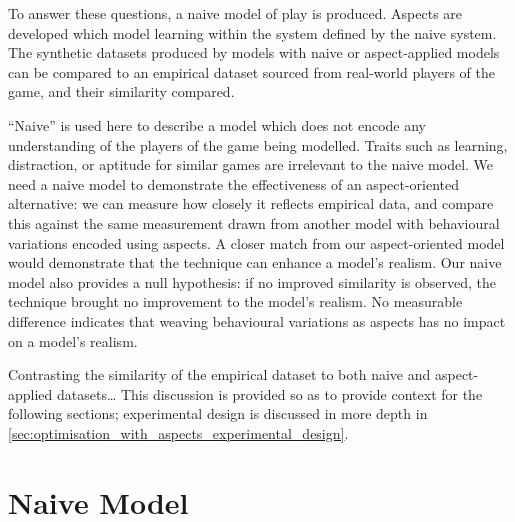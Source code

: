 
To answer these questions, a naive model of play is produced. Aspects are
developed which model learning within the system defined by the naive system.
The synthetic datasets produced by models with naive or aspect-applied models
can be compared to an empirical dataset sourced from real-world players of the
game, and their similarity compared.

``Naive'' is used here to describe a model which does not encode any
understanding of the players of the game being modelled. Traits such as
learning, distraction, or aptitude for similar games are irrelevant to the naive
model. We need a naive model to demonstrate the effectiveness of an
aspect-oriented alternative: we can measure how closely it reflects empirical
data, and compare this against the same measurement drawn from another model
with behavioural variations encoded using aspects. A closer match from our
aspect-oriented model would demonstrate that the technique can enhance a model's
realism. Our naive model also provides a null hypothesis: if no improved
similarity is observed, the technique brought no improvement to the model's
realism. No measurable difference indicates that weaving behavioural variations
as aspects has no impact on a model's realism.


 Contrasting the similarity of the empirical dataset to both
naive and aspect-applied datasets\ldots{} This discussion is provided so as to
provide context for the following sections; experimental design is discussed in
more depth in \cref{sec:optimisation_with_aspects_experimental_design}. 


\section{Naive Model}\label{sec:optimisation_with_aspects_naivemodel}

